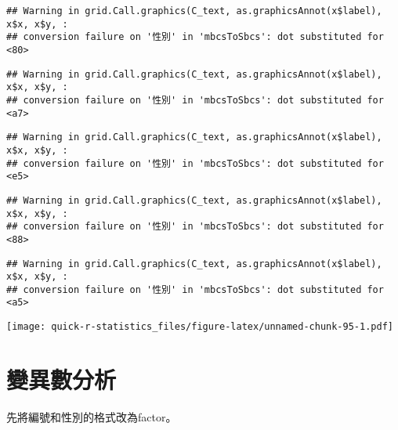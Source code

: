 \documentclass[
]{book}
\newenvironment{Shaded}{\begin{snugshade}}{\end{snugshade}}
\newcommand{\FunctionTok}[1]{\textcolor[rgb]{0.00,0.00,0.00}{#1}}
\newcommand{\NormalTok}[1]{#1}
\newcommand{\OtherTok}[1]{\textcolor[rgb]{0.56,0.35,0.01}{#1}}
\newcommand{\SpecialCharTok}[1]{\textcolor[rgb]{0.00,0.00,0.00}{#1}}
\begin{document}
\begin{verbatim}
## Warning in grid.Call.graphics(C_text, as.graphicsAnnot(x$label), x$x, x$y, :
## conversion failure on '性別' in 'mbcsToSbcs': dot substituted for <80>
\end{verbatim}

\begin{verbatim}
## Warning in grid.Call.graphics(C_text, as.graphicsAnnot(x$label), x$x, x$y, :
## conversion failure on '性別' in 'mbcsToSbcs': dot substituted for <a7>
\end{verbatim}

\begin{verbatim}
## Warning in grid.Call.graphics(C_text, as.graphicsAnnot(x$label), x$x, x$y, :
## conversion failure on '性別' in 'mbcsToSbcs': dot substituted for <e5>
\end{verbatim}

\begin{verbatim}
## Warning in grid.Call.graphics(C_text, as.graphicsAnnot(x$label), x$x, x$y, :
## conversion failure on '性別' in 'mbcsToSbcs': dot substituted for <88>
\end{verbatim}

\begin{verbatim}
## Warning in grid.Call.graphics(C_text, as.graphicsAnnot(x$label), x$x, x$y, :
## conversion failure on '性別' in 'mbcsToSbcs': dot substituted for <a5>
\end{verbatim}

\texttt{[image: quick-r-statistics\_files/figure-latex/unnamed-chunk-95-1.pdf]}

\hypertarget{ux8b8aux7570ux6578ux5206ux6790-2}{%
\section{變異數分析}\label{ux8b8aux7570ux6578ux5206ux6790-2}}

先將編號和性別的格式改為factor。

\begin{Shaded}
\end{Shaded}
\end{document}
